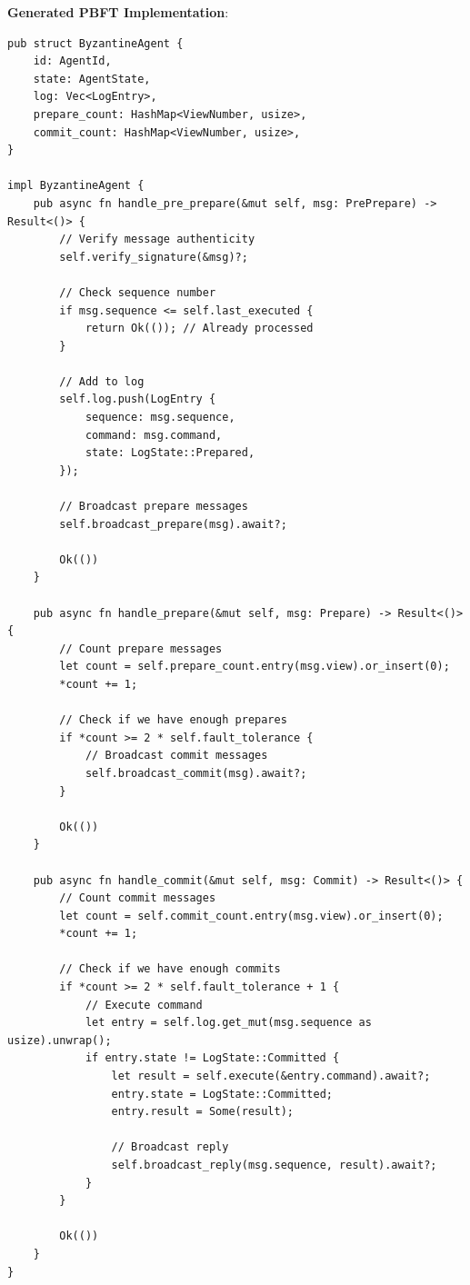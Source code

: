 \textbf{Generated PBFT Implementation}:

\begin{verbatim}
pub struct ByzantineAgent {
    id: AgentId,
    state: AgentState,
    log: Vec<LogEntry>,
    prepare_count: HashMap<ViewNumber, usize>,
    commit_count: HashMap<ViewNumber, usize>,
}

impl ByzantineAgent {
    pub async fn handle_pre_prepare(&mut self, msg: PrePrepare) -> Result<()> {
        // Verify message authenticity
        self.verify_signature(&msg)?;

        // Check sequence number
        if msg.sequence <= self.last_executed {
            return Ok(()); // Already processed
        }

        // Add to log
        self.log.push(LogEntry {
            sequence: msg.sequence,
            command: msg.command,
            state: LogState::Prepared,
        });

        // Broadcast prepare messages
        self.broadcast_prepare(msg).await?;

        Ok(())
    }

    pub async fn handle_prepare(&mut self, msg: Prepare) -> Result<()> {
        // Count prepare messages
        let count = self.prepare_count.entry(msg.view).or_insert(0);
        *count += 1;

        // Check if we have enough prepares
        if *count >= 2 * self.fault_tolerance {
            // Broadcast commit messages
            self.broadcast_commit(msg).await?;
        }

        Ok(())
    }

    pub async fn handle_commit(&mut self, msg: Commit) -> Result<()> {
        // Count commit messages
        let count = self.commit_count.entry(msg.view).or_insert(0);
        *count += 1;

        // Check if we have enough commits
        if *count >= 2 * self.fault_tolerance + 1 {
            // Execute command
            let entry = self.log.get_mut(msg.sequence as usize).unwrap();
            if entry.state != LogState::Committed {
                let result = self.execute(&entry.command).await?;
                entry.state = LogState::Committed;
                entry.result = Some(result);

                // Broadcast reply
                self.broadcast_reply(msg.sequence, result).await?;
            }
        }

        Ok(())
    }
}
\end{verbatim}

